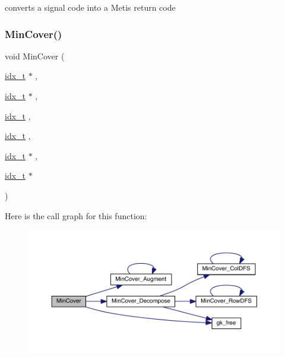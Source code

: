 converts a signal code into a Metis return code \mbox{\label{a00945_a0e648504c6fd9044875e7783b9916f9b}} 
\subsubsection{\texorpdfstring{Min\+Cover()}{MinCover()}}
{\footnotesize\ttfamily void Min\+Cover (\begin{DoxyParamCaption}\item[{\hyperlink{a00876_aaa5262be3e700770163401acb0150f52}{idx\+\_\+t} $\ast$}]{,  }\item[{\hyperlink{a00876_aaa5262be3e700770163401acb0150f52}{idx\+\_\+t} $\ast$}]{,  }\item[{\hyperlink{a00876_aaa5262be3e700770163401acb0150f52}{idx\+\_\+t}}]{,  }\item[{\hyperlink{a00876_aaa5262be3e700770163401acb0150f52}{idx\+\_\+t}}]{,  }\item[{\hyperlink{a00876_aaa5262be3e700770163401acb0150f52}{idx\+\_\+t} $\ast$}]{,  }\item[{\hyperlink{a00876_aaa5262be3e700770163401acb0150f52}{idx\+\_\+t} $\ast$}]{ }\end{DoxyParamCaption})}

Here is the call graph for this function\+:\nopagebreak
\begin{figure}[H]
\begin{center}
\leavevmode
\includegraphics[width=350pt]{a00945_a0e648504c6fd9044875e7783b9916f9b_cgraph}
\end{center}
\end{figure}
\mbox{\label{a00945_a40e05f15cea2a5fd463adabd12918907}} 

